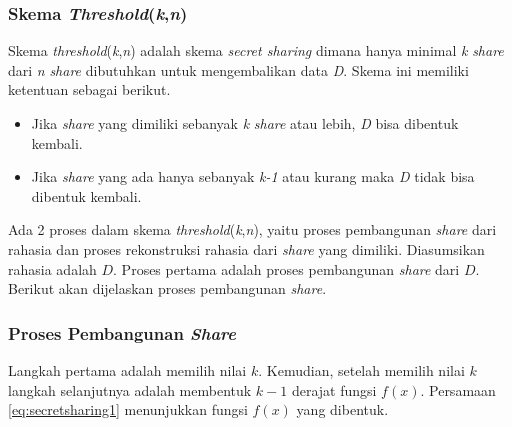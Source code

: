 \subsubsection{Skema \textit{Threshold}(\textit{k},\textit{n})}

Skema \textit{threshold}(\textit{k},\textit{n}) adalah skema \textit{secret sharing} dimana hanya minimal \textit{k} \textit{share} dari \textit{n} \textit{share} dibutuhkan untuk mengembalikan data \textit{D}. Skema ini memiliki ketentuan sebagai berikut\cite{shamir1979share}.

\begin{itemize}
	\item Jika \textit{share} yang dimiliki sebanyak \textit{k} \textit{share} atau lebih, \textit{D} bisa dibentuk kembali.
	\item Jika \textit{share} yang ada hanya sebanyak \textit{k-1} atau kurang maka \textit{D} tidak bisa dibentuk kembali.
\end{itemize}

Ada 2 proses dalam skema \textit{threshold}(\textit{k},\textit{n}), yaitu proses pembangunan \textit{share} dari rahasia dan proses rekonstruksi rahasia dari \textit{share} yang dimiliki. Diasumsikan rahasia adalah \begin{math}D\end{math}. Proses pertama adalah proses pembangunan \textit{share} dari \begin{math}D\end{math}. Berikut akan dijelaskan proses pembangunan \textit{share}.

\subsubsection{Proses Pembangunan \textit{Share}}

Langkah pertama adalah memilih nilai \begin{math}k\end{math}. Kemudian, setelah memilih nilai \begin{math}k\end{math} langkah selanjutnya adalah membentuk \begin{math}k-1\end{math} derajat fungsi \begin{math}f(x)\end{math}. Persamaan \ref{eq:secretsharing1} menunjukkan fungsi \begin{math}f(x)\end{math} yang dibentuk.


